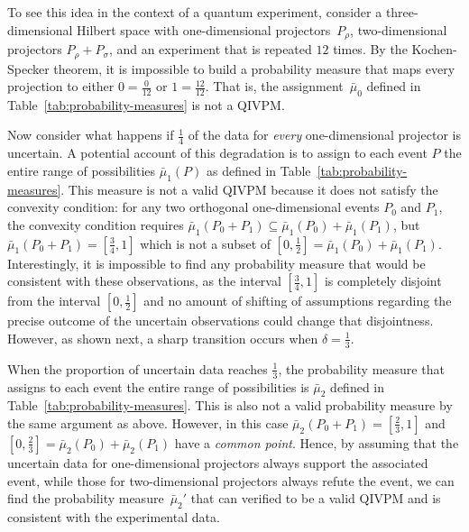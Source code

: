 \documentclass[english,reprint, aps, prl,superscriptaddress, showpacs,
showkeys, longbibliography, amsmath, amssymb, floatfix]{revtex4-1}
\theoremstyle{plain}
\theoremstyle{definition}
\begin{document}
To see this idea in the context of a quantum experiment, consider
a three-dimensional Hilbert space with one-dimensional projectors~$P_{\rho}$,
two-dimensional projectors $P_{\rho}+P_{\sigma}$, and an experiment
that is repeated $12$ times. By the Kochen-Specker theorem, it is impossible
to build a probability measure that maps every projection to either
$0=\frac{0}{12}$ or $1=\frac{12}{12}$. That is, the assignment~$\bar{\mu}_{0}$
defined in Table~\ref{tab:probability-measures} is not a QIVPM.

Now consider what happens if $\frac{1}{4}$ of the data for \emph{every}
one-dimensional projector is uncertain. A potential account of this
degradation is to assign to each event $P$ the entire range of possibilities
$\bar{\mu}_{1}(P)$ as defined in Table~\ref{tab:probability-measures}.
This measure is not a valid QIVPM because it does not satisfy
the convexity condition: for any two orthogonal one-dimensional events
$P_{0}$ and $P_{1}$, the convexity condition requires $\bar{\mu}_{1}\left(P_{0}+P_{1}\right)\subseteq\bar{\mu}_{1}\left(P_{0}\right)+\bar{\mu}_{1}\left(P_{1}\right)$,
but $\bar{\mu}_{1}\left(P_{0}+P_{1}\right)=\left[\tfrac{3}{4},1\right]$
which is not a subset of $\left[0,\tfrac{1}{2}\right]=\bar{\mu}_{1}\left(P_{0}\right)+\bar{\mu}_{1}\left(P_{1}\right)$.
Interestingly, it is impossible to find any probability measure that
would be consistent with these observations, as the interval $\left[\tfrac{3}{4},1\right]$
is completely disjoint from the interval $\left[0,\tfrac{1}{2}\right]$
and no amount of shifting of assumptions regarding the precise outcome
of the uncertain observations could change that disjointness. However,
as shown next, a sharp transition occurs when $\delta=\tfrac{1}{3}$.

When the proportion of uncertain data reaches $\frac{1}{3}$, the probability measure
that assigns to each event the entire range of possibilities is
$\bar{\mu}_{2}$ defined in Table~\ref{tab:probability-measures}.
This is also not a valid probability measure by the same
argument as above. However, in this case $\bar{\mu}_{2}\left(P_{0}+P_{1}\right)=\left[\tfrac{2}{3},1\right]$
and $\left[0,\tfrac{2}{3}\right]=\bar{\mu}_{2}\left(P_{0}\right)+\bar{\mu}_{2}\left(P_{1}\right)$
have a \emph{common point}. Hence, by assuming that the uncertain data for
one-dimensional projectors always support the associated event, while
those for two-dimensional projectors always refute the event, we can
find the probability measure~$\bar{\mu}_{2}'$ that can verified to be a
valid QIVPM and is consistent with the experimental data.
\end{document}
